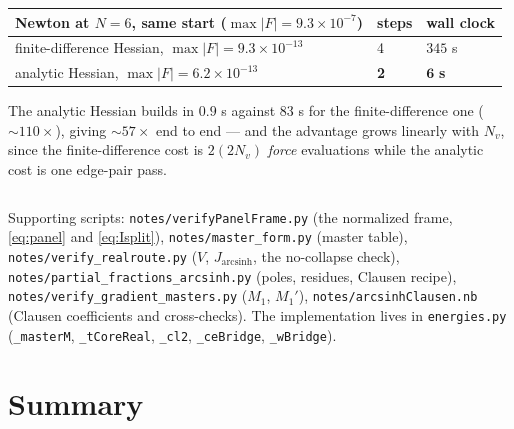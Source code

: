 \documentclass[11pt]{article}
\numberwithin{equation}{section}
\DeclareMathOperator{\arcsinh}{arcsinh}
\begin{document}
\begin{center}
\begin{tabular}{lll}
\hline
Newton at $N=6$, same start ($\max|F|=9.3\times10^{-7}$) & steps & wall clock\\
\hline
finite-difference Hessian, $\max|F|=9.3\times10^{-13}$ & 4 & $345$ s\\
analytic Hessian, $\max|F|=6.2\times10^{-13}$ & \textbf{2} & $\mathbf{6}$ \textbf{s}\\
\hline
\end{tabular}
\end{center}
\noindent The analytic Hessian builds in $0.9$ s against $83$ s for the finite-difference one
($\sim110\times$), giving $\sim57\times$ end to end --- and the advantage grows linearly with $N_v$,
since the finite-difference cost is $2(2N_v)$ \emph{force} evaluations while the analytic cost is one
edge-pair pass.

\begin{center}
\begin{tabular}{lll}
\hline
\end{tabular}
\end{center}

\begin{sloppypar}
\noindent Supporting scripts: \texttt{notes/verifyPanelFrame.py}
(the normalized frame, \eqref{eq:panel} and \eqref{eq:Isplit}),
\texttt{notes/master\_form.py} (master table),
\texttt{notes/verify\_realroute.py} ($V$, $J_{\arcsinh}$, the no-collapse check),
\texttt{notes/partial\_fractions\_arcsinh.py} (poles, residues, Clausen recipe),
\texttt{notes/verify\_gradient\_masters.py} ($M_1$, $M_1'$), \texttt{notes/arcsinhClausen.nb}
(Clausen coefficients and cross-checks). The implementation lives in \texttt{energies.py}
(\texttt{\_masterM}, \texttt{\_tCoreReal}, \texttt{\_cl2}, \texttt{\_ceBridge}, \texttt{\_wBridge}).
\end{sloppypar}

\section{Summary}
\end{document}
